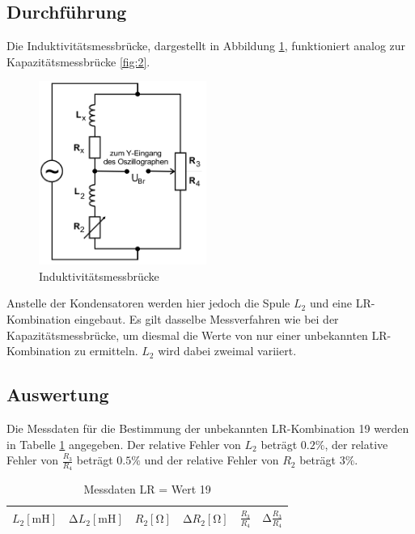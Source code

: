 \subsection{Durchführung}
Die Induktivitätsmessbrücke, dargestellt in Abbildung \ref{fig:3}, funktioniert analog zur Kapazitätsmessbrücke \ref{fig:2}.
\begin{figure}[H]
  \centering
  \includegraphics[height=6cm]{indu.png}
  \caption{Induktivitätsmessbrücke \cite{sample}}
  \label{fig:3}
\end{figure}
Anstelle der Kondensatoren werden hier jedoch die Spule $L_2$ und eine LR-Kombination eingebaut.
Es gilt dasselbe Messverfahren wie bei der Kapazitätsmessbrücke, um diesmal die Werte von nur einer unbekannten LR-Kombination zu ermitteln.
$L_2$ wird dabei zweimal variiert.
\subsection{Auswertung}
Die Messdaten für die Bestimmung der unbekannten LR-Kombination 19 werden in Tabelle \ref{tab:6} angegeben.
Der relative Fehler von $L_2$ beträgt $0.2\%$, der relative Fehler von $\frac{R_3}{R_4}$ beträgt $0.5\%$ und der relative Fehler von $R_2$ beträgt $3\%$. \cite{sample}
\begin{table}
  \centering
  \caption{Messdaten LR = Wert 19}
  \label{tab:6}
  \begin{tabular}{c c c c c c}
    \toprule
    {$L_2 [\si{\milli\henry}]$} & {$\increment L_2 [\si{\milli\henry}]$} & {$R_2 [\si{\ohm}]$} & {$\increment R_2 [\si{\ohm}]$} & {$\frac{R_3}{R_4}$} & {$\increment \frac{R_3}{R_4}$} \\
    \midrule
    
    \bottomrule
  \end{tabular}
\end{table}

